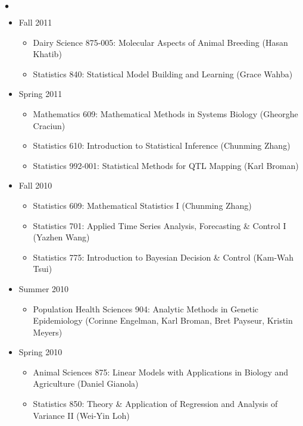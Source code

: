 \documentclass[margin,line,10pt]{res}
\newenvironment{list2}{
  \begin{list}{$\bullet$}{%
      \setlength{\itemsep}{0in}
      \setlength{\parsep}{0in} \setlength{\parskip}{0in}
      \setlength{\topsep}{0in} \setlength{\partopsep}{0in} 
      \setlength{\leftmargin}{0.2in}}}{\end{list}}
\begin{document}
\begin{resume}
\begin{list2}
\begin{itemize}
\item Fall 2011
\begin{itemize}
\item    Dairy Science 875-005: Molecular Aspects of Animal Breeding (Hasan Khatib)
\item    Statistics 840: Statistical Model Building and Learning (Grace Wahba)
\end{itemize}



\item Spring 2011
\begin{itemize}
\item    Mathematics 609: Mathematical Methods in Systems Biology (Gheorghe Craciun)
\item    Statistics 610: Introduction to Statistical Inference (Chunming Zhang)
\item    Statistics 992-001: Statistical Methods for QTL Mapping (Karl Broman)
\end{itemize}


\item Fall 2010
\begin{itemize}
\item    Statistics 609: Mathematical Statistics I (Chunming Zhang)
\item    Statistics 701: Applied Time Series Analysis, Forecasting \& Control I (Yazhen Wang)
\item    Statistics 775: Introduction to Bayesian Decision \& Control (Kam-Wah Tsui)
\end{itemize}


\item Summer 2010
\begin{itemize}
\item    Population Health Sciences 904: Analytic Methods in Genetic Epidemiology (Corinne Engelman, Karl Broman, Bret Payseur, Kristin Meyers)
\end{itemize}


\item Spring 2010
\begin{itemize}

\item    Animal Sciences 875: Linear Models with Applications in Biology and Agriculture (Daniel Gianola)
\item    Statistics 850: Theory \& Application of Regression and Analysis of Variance II (Wei-Yin Loh)

\end{itemize}



\end{itemize}
\end{list2}
\end{resume}
\end{document}
